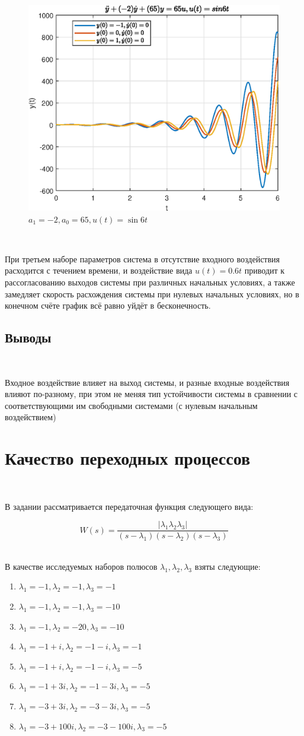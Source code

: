 \documentclass[a4paper]{article}
\begin{document}
\begin{figure}[H]
    \centering
    \includegraphics[width=0.6\linewidth]{ex1/sin6t_-2_65.eps}
    \caption{$a_1 = -2, a_0 = 65, u(t) = \sin{6t}$}
\end{figure}\

При третьем наборе параметров система в отсутствие входного воздействия расходится с течением времени, и воздействие вида $u(t) = 0.6t$ приводит к рассогласованию выходов системы при различных начальных условиях, а также замедляет скорость расхождения системы при нулевых начальных условиях, но в конечном счёте график всё равно уйдёт в бесконечность.

\subsection{Выводы}\

Входное воздействие влияет на выход системы, и разные входные воздействия влияют по-разному, при этом не меняя тип устойчивости системы в сравнении с соответствующими им свободными системами (с нулевым начальным воздействием)

\section{Качество переходных процессов}\

В задании рассматривается передаточная функция следующего вида:

$$
W(s) = \frac{|\lambda_1\lambda_2\lambda_3|}{(s-\lambda_1)(s-\lambda_2)(s-\lambda_3)}
$$\

В качестве исследуемых наборов полюсов $\lambda_1, \lambda_2, \lambda_3$ взяты следующие:

\begin{enumerate}
\item{$\lambda_1=-1, \lambda_2=-1, \lambda_3=-1$}
\item{$\lambda_1=-1, \lambda_2=-1, \lambda_3=-10$}
\item{$\lambda_1=-1, \lambda_2=-20, \lambda_3=-10$}
\item{$\lambda_1=-1+i, \lambda_2=-1-i, \lambda_3=-1$}
\item{$\lambda_1=-1+i, \lambda_2=-1-i, \lambda_3=-5$}
\item{$\lambda_1=-1+3i, \lambda_2=-1-3i, \lambda_3=-5$}
\item{$\lambda_1=-3+3i, \lambda_2=-3-3i, \lambda_3=-5$}
\item{$\lambda_1=-3+100i, \lambda_2=-3-100i, \lambda_3=-5$}
\end{enumerate}\
\end{document}
